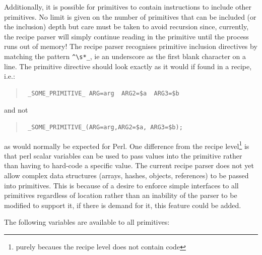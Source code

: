 \documentclass[twoside,11pt]{article}
\renewcommand{\_}{\texttt{\symbol{95}}}
\newenvironment{myquote}{\begin{quote}\begin{small}}{\end{small}\end{quote}}
\begin{document}
Additionally, it is possible for primitives to contain instructions to
include other primitives. No limit is given on the number of
primitives that can be included (or the inclusion) depth but care must 
be taken to avoid recursion since, currently, the recipe parser will
simply continue reading in the primitive until the process runs out of 
memory! The recipe parser recognises primitive inclusion directives
by matching the pattern \verb|^\s*_|, ie an underscore as the first
blank character on a line. The primitive directive should look exactly 
as it would if found in a recipe, i.e.:
\begin{myquote}
\begin{verbatim}
 _SOME_PRIMITIVE_ ARG=arg  ARG2=$a  ARG3=$b
\end{verbatim}
\end{myquote}
and not
\begin{myquote}
\begin{verbatim}
 _SOME_PRIMITIVE_(ARG=arg,ARG2=$a, ARG3=$b);
\end{verbatim}
\end{myquote}
as would normally be expected for Perl. One difference from the recipe 
level\footnote{purely becaues the recipe level does not contain code} is that
perl scalar variables can be used to pass values into the primitive
rather than having to hard-code a specific value. The current recipe
parser does not yet allow complex data structures (arrays, hashes,
objects, references) to be passed into primitives. This is because
of a desire to enforce simple interfaces to all primitives regardless
of location rather than an inability of the parser to be modified to
support it, if there is demand for it, this feature could be added.

The following variables are available to all primitives:
\end{document}

